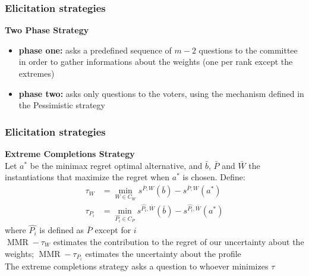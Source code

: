 \documentclass{beamer}
\DeclareMathOperator{\MMR}{MMR}
\begin{document}
	\begin{frame}[t]
		\frametitle{Elicitation strategies}
		\textbf{Two Phase Strategy} \\
		\bigskip
		\begin{itemize}
			\item <2-> \textbf{phase one:} asks a predefined sequence of $m - 2$ questions to the committee in order to gather informations about the weights (one per rank except the extremes)
			\item <3-> \textbf{phase two:} asks only questions to the voters, using the mechanism defined in the Pessimistic strategy
		\end{itemize}
	\end{frame}
	
	\begin{frame}[t]
		\frametitle{Elicitation strategies}
		\textbf{Extreme Completions Strategy} \\
		\medskip
		\onslide<2-> Let $a^{*}$ be the minimax regret optimal alternative, and $\bar{b}$, $\bar{P}$ and $\bar{W}$ the instantiations that maximize the regret when $a^*$ is chosen. \onslide<3-> Define: 
		\begin{align*}
		\tau_{W} & = \min_{W \in C_W} s^{\bar{P},W}(\bar{b}) - s^{\bar{P},W}(a^{*}) \\
		\tau_{P_i} & = \min_{\hat{P_i} \in C_P} s^{\hat{P_i},\bar{W}}(\bar{b}) -  s^{\hat{P_i},\bar{W}}(a^{*})
		\end{align*}
		where $\hat{P_i}$ is defined as $\bar{P}$ except for $i$ \\
		\bigskip
		\onslide<4->
		$\MMR - \tau_{W}$ estimates the contribution to the regret of our uncertainty about the weights; $\MMR - \tau_{P_i}$ estimates the uncertainty about the profile
		\\ \bigskip
		\onslide<5-> The extreme completions strategy asks a question to whoever minimizes $\tau$
	\end{frame}
	
\end{document}
